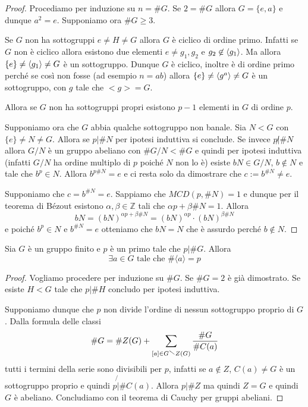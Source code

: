 \begin{proof}
    Procediamo per induzione su \(n = \# G\).
    Se \(2 = \# G\) allora \(G = \{e, a\} \) e dunque \(a^2 = e\). Supponiamo
    ora \(\# G \ge 3\).

    Se \(G\) non ha sottogruppi \(e \neq H \neq G\) allora \(G\) è ciclico di
    ordine primo. Infatti se \(G\) non è ciclico allora esistono due elementi
    \(e\neq g_{1}, g_{2}\) e \(g_{2} \not\in {\left\langle g_{1}\right\rangle} \). Ma allora
    \(\{e\} \neq {\left\langle g_{1}\right\rangle} \neq G\) è un sottogruppo. Dunque \(G\) è
    ciclico, inoltre è di ordine primo perché se così non fosse (ad esempio \(n
    = ab\)) allora \(\{e\} \neq {\left\langle g^{a}\right\rangle} \neq G\) è un sottogruppo, con
    \(g\) tale che \(<g> = G\).

    Allora se \(G\) non ha sottogruppi propri esistono \(p-1\) elementi in \(G\)
    di ordine \(p\).

    Supponiamo ora che \(G\) abbia qualche sottogruppo non banale. Sia \(N < G\)
    con \(\{e\} \neq N \neq G\). Allora se \(p | \# N\) per ipotesi induttiva si
    conclude. Se invece \(p\not| \# N\) allora \(G / N\) è un gruppo abeliano
    con \(\# G / N < \# G\) e quindi per ipotesi induttiva (infatti \(G/N\) ha
    ordine multiplo di \(p\) poiché \(N\) non lo è) esiste \(bN \in G/N\), \(b
    \not\in N\) e tale che \(b^{p} \in N\). Allora \(b^{p\#N} = e\) e ci resta
    solo da dimostrare che \(c := b^{\#N} \neq e\).

    Supponiamo che \(c = b^{\#N} = e\). Sappiamo che \(MCD(p, \#N) = 1\) e
    dunque per il teorema di Bézout esistono \(\alpha, \beta \in \mathbb{Z}\)
    tali che \(\alpha p + \beta \#N = 1\).
    Allora 
    \[
      bN = {(bN)}^{\alpha p + \beta\# N} = {(bN)}^{\alpha p} \cdot {(bN)}^{\beta
      \#N}
    \]
    e poiché \(b^{p} \in N\) e \(b^{\#N} = e\) otteniamo che \(bN = N\) che è
    assurdo perché \(b \not\in N\).
\end{proof}
\begin{theorem}[Cauchy]
    Sia \(G\) è un gruppo finito e \(p\) è un primo tale che \(p | \# G\).
    Allora
    \[
        \exists a \in G \text{ tale che } \# \langle a \rangle = p
    \]
\end{theorem}
\begin{proof}
    Vogliamo procedere per induzione su \(\#G\). Se \(\#G = 2\) è già
    dimostrato. Se esiste \(H < G\) tale che \(p | \# H\) concludo per ipotesi
    induttiva.

    Supponiamo dunque che \(p\) non divide l'ordine di nessun sottogruppo
    proprio di \(G\). Dalla formula delle classi
    \[
        \# G = \# Z{(G)} + \sum_{[a] \in G\sminus Z{(G)}} \frac{\# G}{\# C{(a)}}
    \]
    tutti i termini della serie sono divisibili per \(p\), infatti se \(a
    \not\in Z\), \(C{(a)}\neq G\) è un sottogruppo proprio e quindi \(p \not{|}
    \# C{(a)}\). Allora \(p | \# Z\) ma quindi \(Z = G\) e quindi \(G\) è
    abeliano. Concludiamo con il teorema di Cauchy per gruppi abeliani.
\end{proof}
